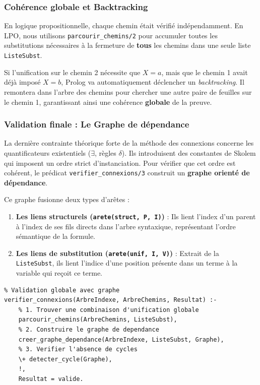 \documentclass[12pt, a4paper]{article}
\begin{document}
\subsubsection{Cohérence globale et Backtracking}

En logique propositionnelle, chaque chemin était vérifié indépendamment. En LPO, nous utilisons \texttt{parcourir\_chemins/2} pour accumuler toutes les substitutions nécessaires à la fermeture de \textbf{tous} les chemins dans une seule liste \texttt{ListeSubst}. 

Si l'unification sur le chemin 2 nécessite que $X=a$, mais que le chemin 1 avait déjà imposé $X=b$, Prolog va automatiquement déclencher un \textit{backtracking}. Il remontera dans l'arbre des chemins pour chercher une autre paire de feuilles sur le chemin 1, garantissant ainsi une cohérence \textbf{globale} de la preuve.

\subsubsection{Validation finale : Le Graphe de dépendance}

La dernière contrainte théorique forte de la méthode des connexions concerne les quantificateurs existentiels ($\exists$, règles $\delta$). Ils introduisent des constantes de Skolem qui imposent un ordre strict d'instanciation. Pour vérifier que cet ordre est cohérent, le prédicat \texttt{verifier\_connexions/3} construit un \textbf{graphe orienté de dépendance}.

Ce graphe fusionne deux types d'arêtes :
\begin{enumerate}
    \item \textbf{Les liens structurels (\texttt{arete(struct, P, I)})} : Ils lient l'index d'un parent à l'index de ses fils directs dans l'arbre syntaxique, représentant l'ordre sémantique de la formule.
    \item \textbf{Les liens de substitution (\texttt{arete(unif, I, V)})} : Extrait de la \texttt{ListeSubst}, ils lient l'indice d'une position présente dans un terme à la variable qui reçoit ce terme.
\end{enumerate}

\begin{lstlisting}
% Validation globale avec graphe
verifier_connexions(ArbreIndexe, ArbreChemins, Resultat) :-
    % 1. Trouver une combinaison d'unification globale
    parcourir_chemins(ArbreChemins, ListeSubst),
    % 2. Construire le graphe de dependance
    creer_graphe_dependance(ArbreIndexe, ListeSubst, Graphe),
    % 3. Verifier l'absence de cycles
    \+ detecter_cycle(Graphe),
    !, 
    Resultat = valide.
\end{lstlisting}
\end{document}
